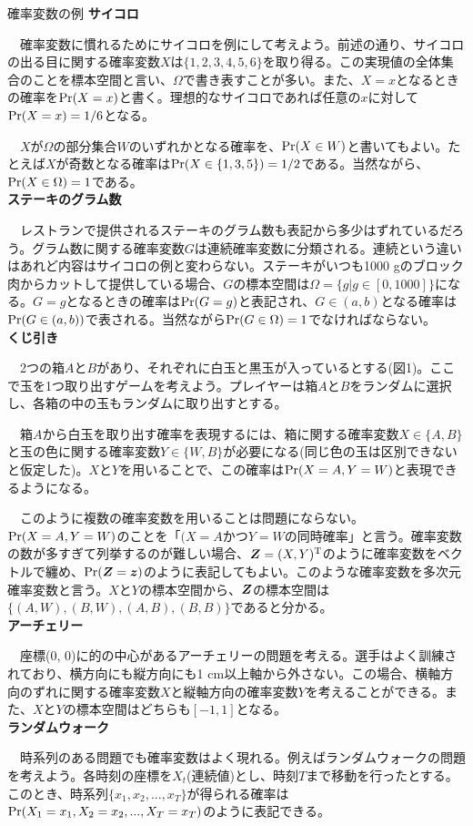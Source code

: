 \documentclass[dvipdfmx, 9pt, a4paper]{jsarticle}
\newcommand{\bm}[1]{{\mbox{\boldmath $#1$}}}
\begin{document}
\begin{itembox}[l]{確率変数の例}
{\bf サイコロ} \par
　確率変数に慣れるためにサイコロを例にして考えよう。前述の通り、サイコロの出る目に関する確率変数$X$は$\{ 1,2,3,4,5,6 \}$を取り得る。この実現値の全体集合のことを標本空間と言い、$\Omega$で書き表すことが多い。また、$X=x$となるときの確率を${\rm Pr}(X=x)$と書く。理想的なサイコロであれば任意の$x$に対して${\rm Pr}(X=x)=1/6$となる。\par
　$X$が$\Omega$の部分集合$W$のいずれかとなる確率を、${\rm Pr}(X \in W)$と書いてもよい。たとえば$X$が奇数となる確率は${\rm Pr}(X \in \{ 1,3,5 \})=1/2$である。当然ながら、${\rm Pr}(X \in \Omega)=1$である。\bigskip \\
{\bf ステーキのグラム数}\par
　レストランで提供されるステーキのグラム数も表記から多少はずれているだろう。グラム数に関する確率変数$G$は連続確率変数に分類される。連続という違いはあれど内容はサイコロの例と変わらない。ステーキがいつも1000 gのブロック肉からカットして提供している場合、$G$の標本空間は$\Omega = \{ g | g \in [0, 1000] \}$になる。$G=g$となるときの確率は${\rm Pr}(G=g)$と表記され、$G \in (a, b)$となる確率は${\rm Pr}(G \in (a, b))$で表される。当然ながら${\rm Pr}(G \in \Omega)=1$でなければならない。\bigskip \\
{\bf くじ引き}\par
　2つの箱$A$と$B$があり、それぞれに白玉と黒玉が入っているとする(図1)。ここで玉を1つ取り出すゲームを考えよう。プレイヤーは箱$A$と$B$をランダムに選択し、各箱の中の玉もランダムに取り出すとする。\par
　箱$A$から白玉を取り出す確率を表現するには、箱に関する確率変数$X \in \{ A, B \}$と玉の色に関する確率変数$Y \in \{ W, B \}$が必要になる(同じ色の玉は区別できないと仮定した)。$X$と$Y$を用いることで、この確率は${\rm Pr}(X=A, Y=W)$と表現できるようになる。\par
　このように複数の確率変数を用いることは問題にならない。${\rm Pr}(X=A, Y=W)$のことを「$(X=AかつY=W$の同時確率」と言う。確率変数の数が多すぎて列挙するのが難しい場合、$\bm Z=(X, Y)^{\rm T}$のように確率変数をベクトルで纏め、${\rm Pr}(\bm Z = \bm z)$のように表記してもよい。このような確率変数を多次元確率変数と言う。$X$と$Y$の標本空間から、$\bm Z$の標本空間は$\{ (A, W), (B, W), (A, B), (B, B) \}$であると分かる。 \bigskip \\
{\bf アーチェリー}\par
　座標(0, 0)に的の中心があるアーチェリーの問題を考える。選手はよく訓練されており、横方向にも縦方向にも1 cm以上軸から外さない。この場合、横軸方向のずれに関する確率変数$X$と縦軸方向の確率変数$Y$を考えることができる。また、$X$と$Y$の標本空間はどちらも$[-1,1]$となる。\bigskip \\
{\bf ランダムウォーク}\par
　時系列のある問題でも確率変数はよく現れる。例えばランダムウォークの問題を考えよう。各時刻の座標を$X_t$(連続値)とし、時刻$T$まで移動を行ったとする。このとき、時系列$\{ x_1, x_2, ..., x_T \}$が得られる確率は${\rm Pr}(X_1=x_1, X_2=x_2,..., X_T=x_T)$のように表記できる。
\end{itembox}
\end{document}
